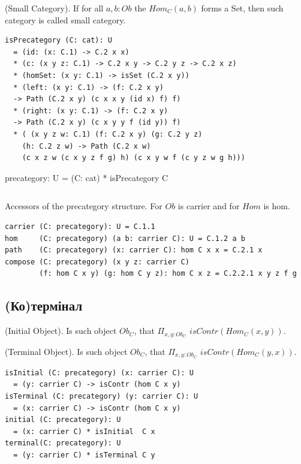 \begin{definition} (Small Category).
If for all $a,b: Ob$ the $Hom_C(a,b)$ forms a Set, then
such category is called small category.
\begin{lstlisting}
isPrecategory (C: cat): U
  = (id: (x: C.1) -> C.2 x x)
  * (c: (x y z: C.1) -> C.2 x y -> C.2 y z -> C.2 x z)
  * (homSet: (x y: C.1) -> isSet (C.2 x y))
  * (left: (x y: C.1) -> (f: C.2 x y)
  -> Path (C.2 x y) (c x x y (id x) f) f)
  * (right: (x y: C.1) -> (f: C.2 x y)
  -> Path (C.2 x y) (c x y y f (id y)) f)
  * ( (x y z w: C.1) (f: C.2 x y) (g: C.2 y z)
    (h: C.2 z w) -> Path (C.2 x w)
    (c x z w (c x y z f g) h) (c x y w f (c y z w g h)))
\end{lstlisting}
precategory: U = (C: cat) * isPrecategory C
\begin{lstlisting}
\end{lstlisting}
\end{definition}

Accessors of the precategory structure.
For $Ob$ is carrier and for $Hom$ is hom.

\begin{lstlisting}
carrier (C: precategory): U = C.1.1
hom     (C: precategory) (a b: carrier C): U = C.1.2 a b
path    (C: precategory) (x: carrier C): hom C x x = C.2.1 x
compose (C: precategory) (x y z: carrier C)
        (f: hom C x y) (g: hom C y z): hom C x z = C.2.2.1 x y z f g
\end{lstlisting}

\subsection{(Ко)термінал}
\begin{definition} (Initial Object).
Is such object $Ob_C$, that $\Pi_{x,y:Ob_C}$ $isContr(Hom_C(x,y))$.
\end{definition}

\begin{definition} (Terminal Object).
Is such object $Ob_C$, that $\Pi_{x,y:Ob_C}$ $isContr(Hom_C(y,x))$.
\begin{lstlisting}
isInitial (C: precategory) (x: carrier C): U
  = (y: carrier C) -> isContr (hom C x y)
isTerminal (C: precategory) (y: carrier C): U
  = (x: carrier C) -> isContr (hom C x y)
initial (C: precategory): U
  = (x: carrier C) * isInitial  C x
terminal(C: precategory): U
  = (y: carrier C) * isTerminal C y
\end{lstlisting}
\end{definition}

